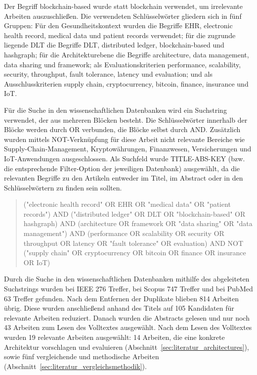 Der Begriff \glqq blockchain-based\grqq{} wurde statt \glqq blockchain\grqq{} verwendet, um irrelevante Arbeiten auszuschließen. Die verwendeten Schlüsselwörter gliedern sich in fünf Gruppen: Für den Gesundheitskontext wurden die Begriffe EHR, electronic health record, medical data und patient records verwendet; für die zugrunde liegende DLT die Begriffe DLT, distributed ledger, blockchain-based und hashgraph; für die Architekturebene die Begriffe architecture, data management, data sharing und framework; als Evaluationskriterien performance, scalability, security, throughput, fault tolerance, latency und evaluation; und als Ausschlusskriterien supply chain, cryptocurrency, bitcoin, finance, insurance und IoT.

Für die Suche in den wissenschaftlichen Datenbanken wird ein Suchstring verwendet, der aus mehreren Blöcken besteht. Die Schlüsselwörter innerhalb der Blöcke werden durch OR verbunden, die Blöcke selbst durch AND. Zusätzlich wurden mittels NOT-Verknüpfung für diese Arbeit nicht relevante Bereiche wie Supply-Chain-Management, Kryptowährungen, Finanzwesen, Versicherungen und IoT-Anwendungen ausgeschlossen. Als Suchfeld wurde TITLE-ABS-KEY (bzw. die entsprechende Filter-Option der jeweiligen Datenbank) ausgewählt, da die relevanten Begriffe zu den Artikeln entweder im Titel, im Abstract oder in den Schlüsselwörtern zu finden sein sollten.

\begingroup
{}
\begin{quote}
\raggedright
\ttfamily
("electronic health record" OR EHR OR "medical data" OR "patient records")
AND ("distributed ledger" OR DLT OR "blockchain-based" OR hashgraph) 
AND (architecture OR framework OR "data sharing" OR "data management") 
AND (performance OR scalability OR security OR throughput OR latency OR "fault tolerance" OR evaluation)
AND NOT ("supply chain" OR cryptocurrency OR bitcoin OR finance OR insurance OR IoT)
\end{quote}
\endgroup

Durch die Suche in den wissenschaftlichen Datenbanken mithilfe des abgeleiteten Suchstrings wurden bei IEEE 276 Treffer, bei Scopus 747 Treffer und bei PubMed 63 Treffer gefunden. Nach dem Entfernen der Duplikate blieben 814 Arbeiten übrig. Diese wurden anschließend anhand des Titels auf 105 Kandidaten für relevante Arbeiten reduziert. Danach wurden die Abstracts gelesen und nur noch 43 Arbeiten zum Lesen des Volltextes ausgewählt. Nach dem Lesen des Volltextes wurden 19 relevante Arbeiten ausgewählt: 14 Arbeiten, die eine konkrete Architektur vorschlagen und evaluieren (Abschnitt~\ref{sec:literatur_architectures}), sowie fünf vergleichende und methodische Arbeiten (Abschnitt~\ref{sec:literatur_vergleichsmethodik}).

